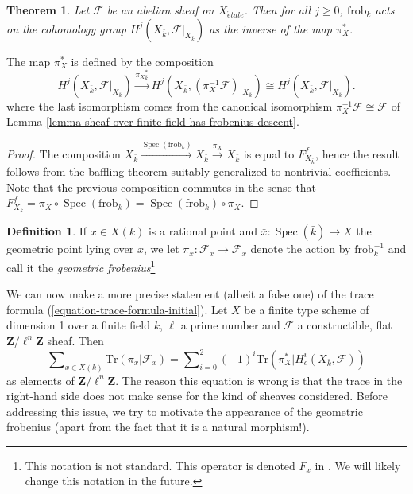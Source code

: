 \documentclass{stacks-project}
\theoremstyle{plain}
\newtheorem{theorem}[subsection]{Theorem}
\theoremstyle{definition}
\newtheorem{definition}[subsection]{Definition}
\theoremstyle{remark}
\numberwithin{equation}{subsection}
\def\Spec{\mathop{\mathrm{Spec}}}
\def\etale{{\acute{e}tale}}
\begin{document}
\begin{theorem}
\label{theorem-geometric-arithmetic-inverse}
Let $\mathcal{F}$ be an abelian sheaf on $X_\etale$. Then for all
$j\geq 0$, $\text{frob}_k$ acts on the cohomology group $H^j(X_{\bar k},
\mathcal{F}|_{X_{\bar k}})$ as the inverse of the map $\pi_X^*$.
\end{theorem}

\noindent
The map $\pi_X^*$ is defined by the composition
$$
H^j(X_{\bar k}, \mathcal{F}|_{X_{\bar k}}) \xrightarrow{{\pi_X}_{\bar k}^*}
H^j(X_{\bar k}, (\pi_X^{-1} \mathcal{F})|_{X_{\bar k}}) \cong
H^j(X_{\bar k}, \mathcal{F}|_{X_{\bar k}}).
$$
where the last isomorphism comes from the canonical isomorphism
$\pi_X^{-1} \mathcal{F} \cong \mathcal{F}$ of
Lemma \ref{lemma-sheaf-over-finite-field-has-frobenius-descent}.

\begin{proof}
The composition $X_{\bar k} \xrightarrow{\Spec(\text{frob}_k)} X_{\bar k}
\xrightarrow{\pi_X} X_{\bar k}$ is equal to $F_{X_{\bar k}}^f$, hence the
result follows from the baffling theorem suitably generalized to nontrivial
coefficients. Note that the previous composition commutes in the sense that
$F_{X_{\bar k}}^f = \pi_X \circ \Spec(\text{frob}_k) =
\Spec(\text{frob}_k) \circ \pi_X$.
\end{proof}

\begin{definition}
\label{definition-geometric-frobenius-on-stalk}
If $x \in X(k)$ is a rational point and $\bar x : \Spec(\bar k) \to X$
the geometric point lying over $x$, we let $\pi_x : \mathcal{F}_{\bar x} \to
\mathcal{F}_{\bar x}$ denote the action by $\text{frob}_k^{-1}$ and call it the
{\it geometric frobenius}\footnote{This notation is not standard.
This operator is denoted $F_x$ in \cite{SGA4.5}. We will likely change
this notation in the future.}
\end{definition}

\noindent
We can now make a more precise statement (albeit a false one) of the trace
formula (\ref{equation-trace-formula-initial}). Let $X$ be a finite
type scheme of dimension 1
over a finite field $k$, $\ell$ a prime number and $\mathcal{F}$ a
constructible, flat $\mathbf{Z}/\ell^n\mathbf{Z}$ sheaf. Then
\begin{equation}
\label{equation-trace-formula-second}
\sum\nolimits_{x \in X(k)}
\text{Tr}(\pi_x | \mathcal{F}_{\bar x})
=
\sum\nolimits_{i = 0}^2
(-1)^i \text{Tr}(\pi_X^* | H^i_c(X_{\bar k}, \mathcal{F}))
\end{equation}
as elements of $\mathbf{Z}/\ell^n\mathbf{Z}$. The reason this equation is wrong
is that the trace in the right-hand side does not make sense for the kind of
sheaves considered. Before addressing this issue, we try to motivate the
appearance of the geometric frobenius (apart from the fact that it is a natural
morphism!).
\end{document}
